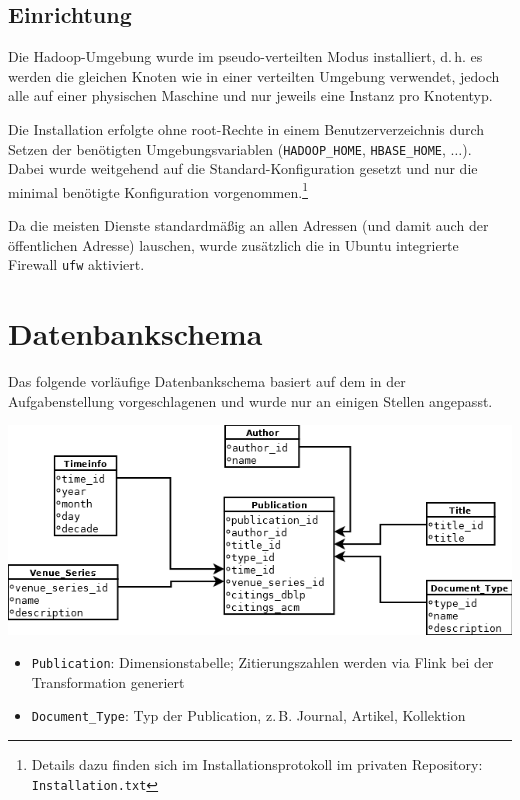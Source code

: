 \documentclass[a4paper,11pt,utf8]{scrartcl}
\begin{document}
\subsection{Einrichtung}

Die Hadoop-Umgebung wurde im pseudo-verteilten Modus installiert, d.\,h. es werden die gleichen Knoten wie in einer verteilten Umgebung verwendet, jedoch alle auf einer physischen Maschine und nur jeweils eine Instanz pro Knotentyp.

Die Installation erfolgte ohne root-Rechte in einem Benutzerverzeichnis durch Setzen der benötigten Umgebungsvariablen (\texttt{HADOOP\_HOME}, \texttt{HBASE\_HOME}, $\dots$). Dabei wurde weitgehend auf die Standard-Konfiguration gesetzt und nur die minimal benötigte Konfiguration vorgenommen.\footnote{Details dazu finden sich im Installationsprotokoll im privaten Repository: \texttt{Installation.txt}}

Da die meisten Dienste standardmäßig an allen Adressen (und damit auch der öffentlichen Adresse) lauschen, wurde zusätzlich die in Ubuntu integrierte Firewall \texttt{ufw} aktiviert.

\section{Datenbankschema}

Das folgende vorläufige Datenbankschema basiert auf dem in der Aufgabenstellung vorgeschlagenen und wurde nur an einigen Stellen angepasst. 

\noindent
\includegraphics[width=\textwidth]{pics/Star-schema-final.png}

\begin{itemize}
    \item \texttt{Publication}: Dimensionstabelle; Zitierungszahlen werden via Flink bei der Transformation generiert
    \item \texttt{Document\_Type}: Typ der Publication, z.\,B. Journal, Artikel, Kollektion
\end{itemize}
\end{document}
